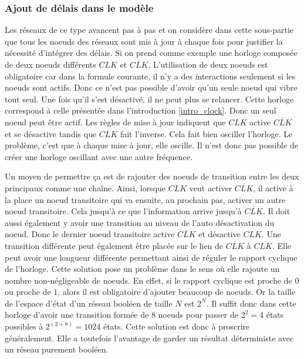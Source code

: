 \documentclass[11pt, a4paper]{article}
\begin{document}
\subsubsection{Ajout de délais dans le modèle}
Les réseaux de ce type avancent pas à pas et on considère dans cette
sous-partie que tous les noeuds des réseaux sont mis à jour à chaque fois pour
justifier la nécessité d'intégrer des délais. Si on prend comme exemple une
horloge composée de deux noeuds différents $CLK$ et $\overline{CLK}$.
L'utilisation de deux noeuds est obligatoire car dans la formule courante, il
n'y a des interactions seulement si les noeuds sont actifs. Donc ce n'est pas
possible d'avoir qu'un seule noeud qui vibre tout seul. Une fois qu'il s'est
désactivé, il ne peut plus se relancer. Cette horloge correspond à celle
présentée dans l'introduction \ref{intro_clock}. Donc un seul noeud peut être
actif. Les règles de mise à jour indiquent que $CLK$ active $\overline{CLK}$ et
se désactive tandis que $\overline{CLK}$ fait l'inverse. Cela fait bien
osciller l'horloge. Le problème, c'est que à chaque mise à jour, elle oscille.
Il n'est donc pas possible de créer une horloge oscillant avec une autre
fréquence.

Un moyen de permettre ça est de rajouter des noeuds de transition entre les
deux principaux comme une chaîne. Ainsi, lorsque $CLK$ veut activer
$\overline{CLK}$, il active à la place un noeud transitoire qui va ensuite, au
prochain pas, activer un autre noeud transitoire. Cela jusqu'à ce que
l'information arrive jusqu'à $\overline{CLK}$. Il doit aussi également y avoir
une transition au niveau de l'auto désactivation du noeud. Donc le dernier
noeud transitoire active $\overline{CLK}$ et désactive $CLK$. Une transition
différente peut également être placée sur le lien de $\overline{CLK}$ à $CLK$.
Elle peut avoir une longueur différente permettant ainsi de réguler le rapport
cyclique de l'horloge. Cette solution pose un problème dans le sens où elle
rajoute un nombre non-négligeable de noeuds. En effet, si le rapport cyclique
est proche de $0$ ou proche de $1$, alors il est obligatoire d'ajouter beaucoup
de noeuds. Or la taille de l'espace d'état d'un réseau booléen de taille $N$
est $2^N$. Il suffit donc dans cette horloge d'avoir une transition formée de
8 noeuds pour passer de $2^2=4$ états possibles à $2^{(2+8)}=1024$ états. Cette
solution est donc à proscrire généralement. Elle a toutefois l'avantage de
garder un résultat déterministe avec un réseau purement booléen.
\end{document}
